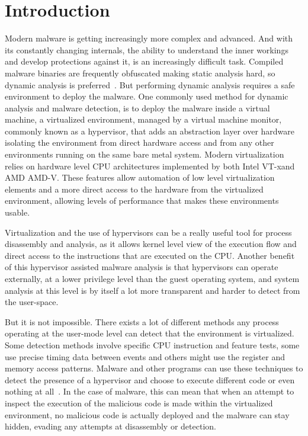 \section{Introduction}\label{s:intro}

Modern malware is getting increasingly more complex and advanced.
And with its constantly changing internals, the ability to understand the inner workings and develop protections against it, is an increasingly difficult task. 
Compiled malware binaries are frequently obfuscated making static analysis hard, so dynamic analysis is preferred~\cite{Leon2021, 10.1145/2245276.2232070}. But performing dynamic analysis requires a safe environment 
to deploy the malware. One commonly used method for dynamic analysis and malware detection, is to deploy the malware inside a virtual machine, a virtualized environment, managed by a virtual machine monitor, 
commonly known as a hypervisor, that adds an abstraction layer over hardware isolating the environment from direct hardware access and from any other environments running on the same bare metal system. 
Modern virtualization relies on hardware level CPU architectures implemented by both Intel\textsuperscript{\tiny\textregistered} VT-x\texttrademark and AMD\textsuperscript{\tiny\textregistered} AMD-V\texttrademark. 
These features allow automation of low level virtualization elements and a more direct access to the hardware from the virtualized environment, allowing levels of performance that makes these environments usable.

Virtualization and the use of hypervisors can be a really useful tool for process disassembly and analysis, as it allows kernel level view of the execution flow and direct access to the instructions that are executed on the CPU.
Another benefit of this hypervisor assisted malware analysis is that hypervisors can operate externally, at a lower privilege level than the guest operating system, 
and system analysis at this level is by itself a lot more transparent and harder to detect from the user-space.

But it is not impossible. There exists a lot of different methods any process operating at the user-mode level can detect that the environment is virtualized. 
Some detection methods involve specific CPU instruction and feature tests, some use precise timing data between events and others might use the register and memory access patterns. 
Malware and other programs can use these techniques to detect the presence of a hypervisor and choose to execute different code or even nothing at all~\cite{10.1109/TIFS.2020.2976559}. 
In the case of malware, this can mean that when an attempt to inspect the execution of the malicious code is made within the virtualized environment, 
no malicious code is actually deployed and the malware can stay hidden, evading any attempts at disassembly or detection.

